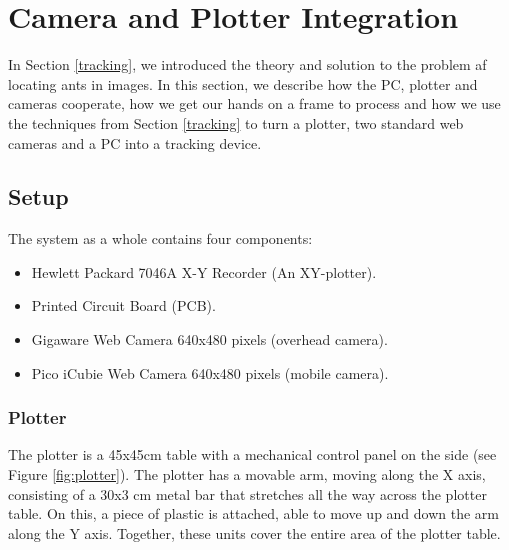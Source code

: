 
\section{Camera and Plotter Integration}


In Section \ref{tracking}, we introduced the theory and solution to the problem af locating ants in images. In this section, we describe how the PC, plotter and cameras cooperate, how we get our hands on a frame to process and how we use the techniques from Section \ref{tracking} to turn a plotter, two standard web cameras and a PC into a tracking device.

\subsection{Setup}

The system as a whole contains four components:

\begin{itemize}
  \item Hewlett Packard 7046A X-Y Recorder (An XY-plotter).
  \item Printed Circuit Board (PCB).
  \item Gigaware Web Camera 640x480 pixels (overhead camera).
  \item Pico iCubie Web Camera 640x480 pixels (mobile camera).
\end{itemize}

\subsubsection{Plotter} \mbox{} \par
The plotter is a 45x45cm table with a mechanical control panel on the side (see Figure \ref{fig:plotter}). The plotter has a movable arm, moving along the X axis, consisting of a 30x3 cm metal bar that stretches all the way across the plotter table. On this, a piece of plastic is attached, able to move up and down the arm along the Y axis. Together, these units cover the entire area of the plotter table. \\

